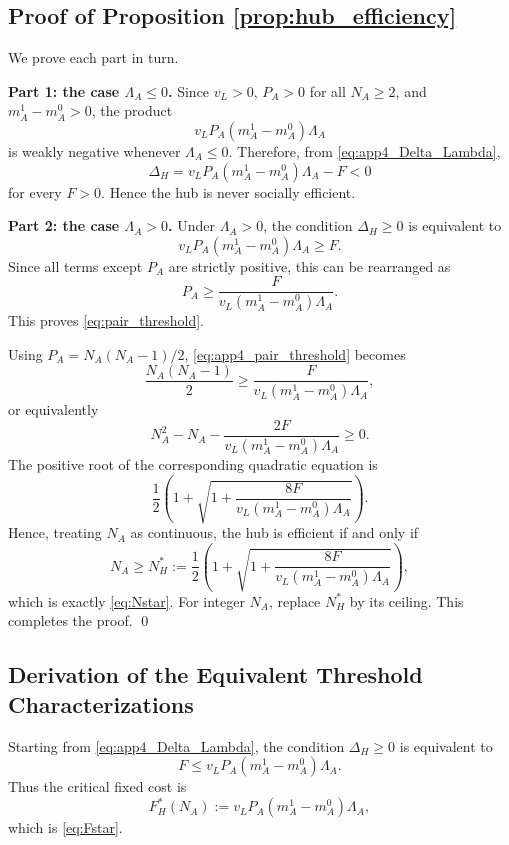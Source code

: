 \subsection{Proof of Proposition \ref{prop:hub_efficiency}}

We prove each part in turn.

\noindent\textbf{Part 1: the case $\Lambda_A\le 0$.}
Since $v_L>0$, $P_A>0$ for all $N_A\ge 2$, and $m_A^1-m_A^0>0$, the product
\[
v_L P_A(m_A^1-m_A^0)\Lambda_A
\]
is weakly negative whenever $\Lambda_A\le 0$. Therefore, from \eqref{eq:app4_Delta_Lambda},
\[
\Delta_H
=
v_L P_A(m_A^1-m_A^0)\Lambda_A-F
<0
\]
for every $F>0$. Hence the hub is never socially efficient.

\noindent\textbf{Part 2: the case $\Lambda_A>0$.}
Under $\Lambda_A>0$, the condition $\Delta_H\ge 0$ is equivalent to
\[
v_L P_A(m_A^1-m_A^0)\Lambda_A\ge F.
\]
Since all terms except $P_A$ are strictly positive, this can be rearranged as
\begin{equation}
P_A
\ge
\frac{F}{v_L(m_A^1-m_A^0)\Lambda_A}.
\label{eq:app4_pair_threshold}
\end{equation}
This proves \eqref{eq:pair_threshold}.

Using $P_A=N_A(N_A-1)/2$, \eqref{eq:app4_pair_threshold} becomes
\[
\frac{N_A(N_A-1)}{2}
\ge
\frac{F}{v_L(m_A^1-m_A^0)\Lambda_A},
\]
or equivalently
\[
N_A^2-N_A-\frac{2F}{v_L(m_A^1-m_A^0)\Lambda_A}\ge 0.
\]
The positive root of the corresponding quadratic equation is
\[
\frac{1}{2}\left(
1+\sqrt{1+\frac{8F}{v_L(m_A^1-m_A^0)\Lambda_A}}
\right).
\]
Hence, treating $N_A$ as continuous, the hub is efficient if and only if
\begin{equation}
N_A\ge
N_H^*
:=
\frac{1}{2}\left(
1+\sqrt{1+\frac{8F}{v_L(m_A^1-m_A^0)\Lambda_A}}
\right),
\label{eq:app4_Nstar}
\end{equation}
which is exactly \eqref{eq:Nstar}. For integer $N_A$, replace $N_H^*$ by its ceiling. This completes the proof.
\qed

\subsection{Derivation of the Equivalent Threshold Characterizations}

Starting from \eqref{eq:app4_Delta_Lambda}, the condition $\Delta_H\ge 0$ is equivalent to
\[
F\le v_L P_A(m_A^1-m_A^0)\Lambda_A.
\]
Thus the critical fixed cost is
\begin{equation}
F_H^*(N_A):=v_L P_A(m_A^1-m_A^0)\Lambda_A,
\label{eq:app4_Fstar}
\end{equation}
which is \eqref{eq:Fstar}.

